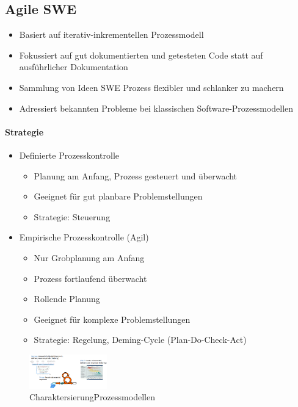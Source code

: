 \documentclass[../ZF_SWEN1.tex]{subfiles}
\begin{document}
\subsection{Agile SWE}
\begin{itemize}
    \item Basiert auf iterativ-inkrementellen Prozessmodell
    \item Fokussiert auf gut dokumentierten und getesteten Code statt auf ausführlicher Dokumentation
    \item Sammlung von Ideen SWE Prozess flexibler und schlanker zu machern
    \item Adressiert bekannten Probleme bei klassischen Software-Prozessmodellen
\end{itemize}

\paragraph{Strategie}
\begin{itemize}
    \item Definierte Prozesskontrolle
    \begin{itemize}
        \item Planung am Anfang, Prozess gesteuert und überwacht
        \item Geeignet für gut planbare Problemstellungen
        \item Strategie: Steuerung
    \end{itemize}
    \item Empirische Prozesskontrolle (Agil)
    \begin{itemize}
        \item Nur Grobplanung am Anfang
        \item Prozess fortlaufend überwacht
        \item Rollende Planung
        \item Geeignet für komplexe Problemstellungen
        \item Strategie: Regelung, Deming-Cycle (Plan-Do-Check-Act)
    \end{itemize}
\end{itemize}

\begin{figure}[H]
\centering
\includegraphics[width=0.3\textwidth]{Resources/Images/CharaktersierungProzessmodellen.png}
\caption{\label{fig:CharaktersierungProzessmodellen}CharaktersierungProzessmodellen}
\end{figure}
\end{document}
